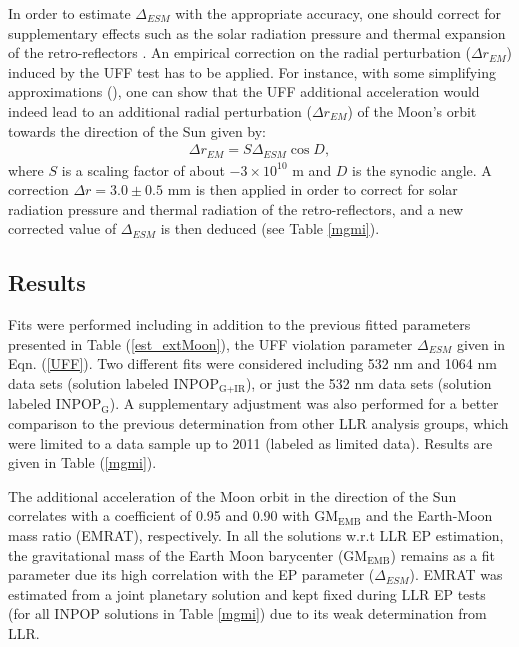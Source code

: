 \documentclass[fleqn,usenatbib,referee]{mnras}
\begin{document}
In order to estimate $\Delta_{ESM}$ with the appropriate accuracy, one should correct for supplementary effects such as the solar radiation pressure and thermal expansion of the retro-reflectors \cite[]{Vokrouhlicky1997,Williams2012}. An empirical correction on the radial perturbation ($\Delta r_{EM}$) induced by the UFF test has to be applied. 
For instance, with some simplifying approximations (\cite{nordtvedt:2014sc}), one can show that the UFF additional acceleration would indeed lead to an additional radial perturbation ($\Delta r_{EM}$) of the Moon's orbit towards the direction of the Sun given by:
\begin{eqnarray}
\Delta r_{EM}= S \Delta_{ESM} \cos D,
\label{SRP}
\end{eqnarray}
where $S$ is a scaling factor of about $-3 \times 10^{10}$ m \cite[]{Williams2012} and $D$ is the synodic angle. A correction ${\Delta r = 3.0 \pm 0.5}$ mm \cite[]{Vokrouhlicky1997,Williams2012} is then applied in order to correct for solar radiation pressure and thermal radiation of the retro-reflectors, and a new corrected value of $\Delta_{ESM}$ is then deduced (see Table \ref{mgmi}).

\subsection{Results}
\label{resultsep}

Fits were performed including in addition to the previous fitted parameters presented in Table (\ref{est_extMoon}), the UFF violation parameter $\Delta_{ESM}$ given in Eqn. (\ref{UFF}). Two different fits were considered including 532 nm and 1064 nm data sets (solution labeled INPOP$_{\textrm{G+IR}}$), or just the 532 nm data sets (solution labeled INPOP$_{\textrm{G}}$). A supplementary adjustment was also performed for a better comparison to the previous determination from other LLR analysis groups, which were limited to a data sample up to 2011 (labeled as limited data). Results are given in Table (\ref{mgmi}).

The additional acceleration of the Moon orbit in the direction of the Sun correlates with a coefficient of 0.95 and 0.90 with GM$_{\textrm{EMB}}$ and the Earth-Moon mass ratio (EMRAT), respectively. In all the solutions w.r.t LLR EP estimation, the gravitational mass of the Earth Moon barycenter (GM$_{\textrm{EMB}}$) remains as a fit parameter due its high correlation with the EP parameter ($\Delta_{ESM}$). EMRAT was estimated from a joint planetary solution and kept fixed during LLR EP tests (for all INPOP solutions in Table \ref{mgmi}) due to its weak determination from LLR. 
\end{document}
